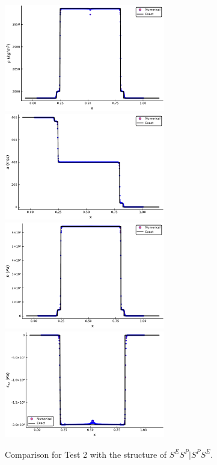 \documentclass{article}
\numberwithin{equation}{section}
\numberwithin{table}{section}
\begin{document}
\begin{figure}[ht]
  \centering
  \includegraphics[width= 7cm] {case2rho.pdf}
  \includegraphics[width= 7cm] {case2u.pdf}
  \includegraphics[width= 7cm] {case2p.pdf}
  \includegraphics[width= 7cm] {case2sxx.pdf}
  \caption{Comparison for Test 2 with the structure of $S^ES^P|S^PS^E$.  }
  \label{fig:case2}
\end{figure}
\end{document}
